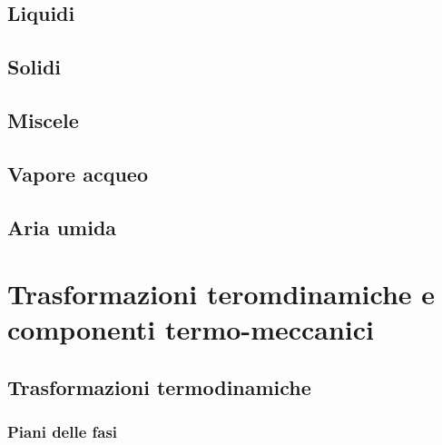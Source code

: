 \section{Liquidi}
\section{Solidi}
\section{Miscele}
\section{Vapore acqueo}
\section{Aria umida}

\chapter{Trasformazioni teromdinamiche e componenti termo-meccanici}\label{thermodynamics:thermal_machines}
\section{Trasformazioni termodinamiche}
\subsection{Piani delle fasi}
\begin{definition}
\end{definition}
\begin{definition}[Piano $T-S$]
\end{definition}
\begin{definition}
\end{definition}

